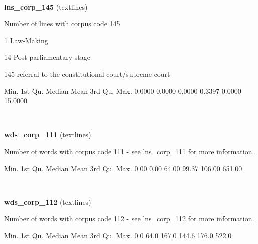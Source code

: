 \documentclass[]{article}
\newenvironment{Shaded}{\begin{snugshade}}{\end{snugshade}}
\newcommand{\FloatTok}[1]{\textcolor[rgb]{0.00,0.00,0.81}{{#1}}}
\newcommand{\NormalTok}[1]{{#1}}
\begin{document}
~

\vspace{1em}

\textbf{lns\_corp\_145} (textlines)

Number of lines with corpus code 145

1 Law-Making

14 Post-parliamentary stage

145 referral to the constitutional court/supreme court

\begin{Shaded}
\begin{Highlighting}[]
   \NormalTok{Min. 1st Qu.  Median    Mean 3rd Qu.    Max. }
 \FloatTok{0.0000}  \FloatTok{0.0000}  \FloatTok{0.0000}  \FloatTok{0.3397}  \FloatTok{0.0000} \FloatTok{15.0000} 
\end{Highlighting}
\end{Shaded}

~

\vspace{1em}

\textbf{wds\_corp\_111} (textlines)

Number of words with corpus code 111 - see lns\_corp\_111 for more
information.

\begin{Shaded}
\begin{Highlighting}[]
   \NormalTok{Min. 1st Qu.  Median    Mean 3rd Qu.    Max. }
   \FloatTok{0.00}    \FloatTok{0.00}   \FloatTok{64.00}   \FloatTok{99.37}  \FloatTok{106.00}  \FloatTok{651.00} 
\end{Highlighting}
\end{Shaded}

~

\vspace{1em}

\textbf{wds\_corp\_112} (textlines)

Number of words with corpus code 112 - see lns\_corp\_112 for more
information.

\begin{Shaded}
\begin{Highlighting}[]
   \NormalTok{Min. 1st Qu.  Median    Mean 3rd Qu.    Max. }
    \FloatTok{0.0}    \FloatTok{64.0}   \FloatTok{167.0}   \FloatTok{144.6}   \FloatTok{176.0}   \FloatTok{522.0} 
\end{Highlighting}
\end{Shaded}

~

\vspace{1em}
\end{document}
